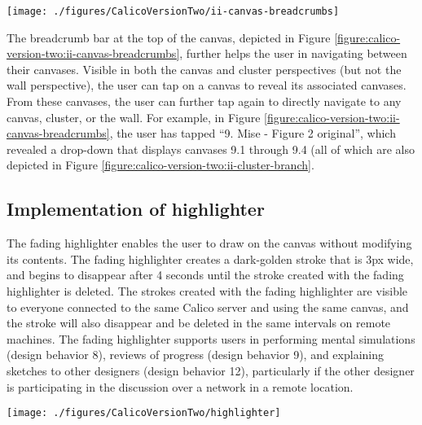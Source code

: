 \documentclass[12pt,fleqn]{ucithesis}
\begin{document}
\begin{figure*}[tbh]
  \centering
  \texttt{[image: ./figures/CalicoVersionTwo/ii-canvas-breadcrumbs]}
  \caption{The breadcrumb bar in the upper-left enables users to navigate between canvases without using the wall or cluster perspectives.}
  \label{figure:calico-version-two:ii-canvas-breadcrumbs}
\end{figure*}

The breadcrumb bar at the top of the canvas, depicted in Figure \ref{figure:calico-version-two:ii-canvas-breadcrumbs}, further helps the user in navigating between their canvases. Visible in both the canvas and cluster perspectives (but not the wall perspective), the user can tap on a canvas to reveal its associated canvases. From these canvases, the user can further tap again to directly navigate to any canvas, cluster, or the wall. For example, in Figure \ref{figure:calico-version-two:ii-canvas-breadcrumbs}, the user has tapped ``9. Mise - Figure 2 original'', which revealed a drop-down that displays canvases 9.1 through 9.4 (all of which are also depicted in Figure \ref{figure:calico-version-two:ii-cluster-branch}.

\subsection{Implementation of highlighter}

The fading highlighter enables the user to draw on the canvas without modifying its contents. The fading highlighter creates a dark-golden stroke that is 3px wide, and begins to disappear after 4 seconds until the stroke created with the fading highlighter is deleted. The strokes created with the fading highlighter are visible to everyone connected to the same Calico server and using the same canvas, and the stroke will also disappear and be deleted in the same intervals on remote machines. The fading highlighter supports users in performing mental simulations (design behavior 8), reviews of progress (design behavior 9), and explaining sketches to other designers (design behavior 12), particularly if the other designer is participating in the discussion over a network in a remote location.

\begin{figure*}[tbh]
  \centering
  \texttt{[image: ./figures/CalicoVersionTwo/highlighter]}
  \caption{Highlighter}
  \label{figure:calico-version-two:highlighter}
\end{figure*}
\end{document}

